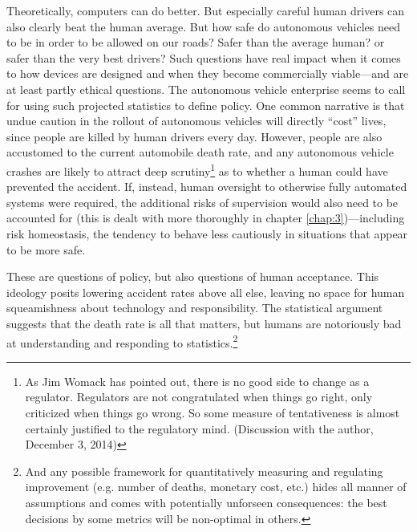 Theoretically, computers can do better. But especially careful human
drivers can also clearly beat the human average. But how safe do
autonomous vehicles need to be in order to be allowed on our roads?
Safer than the average human? or safer than the very best drivers?
Such questions have real impact when it comes to how devices are
designed and when they become commercially viable---and are at least
partly ethical questions. The autonomous
vehicle enterprise seems to call for using such projected statistics
to define policy. One common narrative is that undue caution in the
rollout of autonomous vehicles will directly ``cost'' lives, since
people are killed by human drivers every day.\cite{???-blog} However,
people are also accustomed to the current automobile death rate, and
any autonomous vehicle crashes are likely to attract deep
scrutiny\footnote{As Jim Womack has pointed out, there is no good side
to change as a regulator. Regulators are not congratulated when things
go right, only criticized when things go wrong. So some measure of
tentativeness is almost certainly justified to the regulatory mind.
(Discussion with the author, December 3, 2014)} as
to whether a human could have prevented the accident.\cite{???} If,
instead, human oversight to otherwise fully automated systems were
required, the additional risks of supervision would also need to be
accounted for (this is dealt with more thoroughly in chapter
\ref{chap:3})---including risk homeostasis\cite{???}, the tendency to
behave less cautiously in situations that appear to be more safe.

These are questions of policy, but also questions of human acceptance.
This ideology posits lowering accident rates above all else, leaving
no space for human squeamishness about technology and responsibility. 
The statistical argument suggests that the death rate is all that
matters, but humans are notoriously bad at understanding and
responding to statistics.\footnote{And any possible framework for
  quantitatively measuring and regulating improvement (e.g. number of deaths,
  monetary cost, etc.) hides all manner of assumptions and comes with
  potentially unforseen consequences: the best decisions by some
  metrics will be non-optimal in others.}

